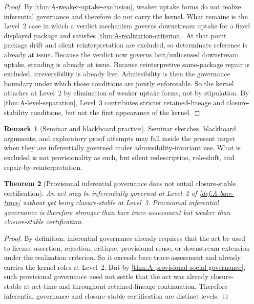 \documentclass[11pt]{article}
\theoremstyle{plain}
\newtheorem{theorem}{Theorem}[section]
\theoremstyle{definition}
\newtheorem{remark}[theorem]{Remark}
\begin{document}
\begin{proof}
By \cref{thm:A-weaker-uptake-exclusion}, weaker uptake forms do not realize inferential governance and therefore do not carry the kernel. What remains is the Level~2 case in which a verdict mechanism governs downstream uptake for a fixed displayed package and satisfies \cref{thm:A-realization-criterion}. At that point package drift and silent reinterpretation are excluded, so determinate reference is already at issue. Because the verdict now governs licit/unlicensed downstream uptake, standing is already at issue. Because reinterpretive same-package repair is excluded, irreversibility is already live. Admissibility is then the governance boundary under which those conditions are jointly enforceable. So the kernel attaches at Level~2 by elimination of weaker uptake forms, not by stipulation. By \cref{thm:A-level-separation}, Level~3 contributes stricter retained-lineage and closure-stability conditions, but not the first appearance of the kernel.
\end{proof}

\begin{remark}[Seminar and blackboard practice]
Seminar sketches, blackboard arguments, and exploratory proof attempts may fall inside the present target when they are inferentially governed under admissibility-invariant use. What is excluded is not provisionality as such, but silent redescription, role-shift, and repair-by-reinterpretation.
\end{remark}

\begin{theorem}[Provisional inferential governance does not entail closure-stable certification]
\label{thm:A-provisional-not-closure}
An act may be inferentially governed at Level~2 of \cref{def:A-bare-trace} without yet being closure-stable at Level~3. Provisional inferential governance is therefore stronger than bare trace-assessment but weaker than closure-stable certification.
\end{theorem}

\begin{proof}
By definition, inferential governance already requires that the act be used to license assertion, rejection, critique, provisional reuse, or downstream extension under the realization criterion. So it exceeds bare trace-assessment and already carries the kernel roles at Level~2. But by \cref{thm:A-provisional-social-governance}, such provisional governance need not settle that the act was already closure-stable at act-time and throughout retained-lineage continuation. Therefore inferential governance and closure-stable certification are distinct levels.
\end{proof}
\end{document}
